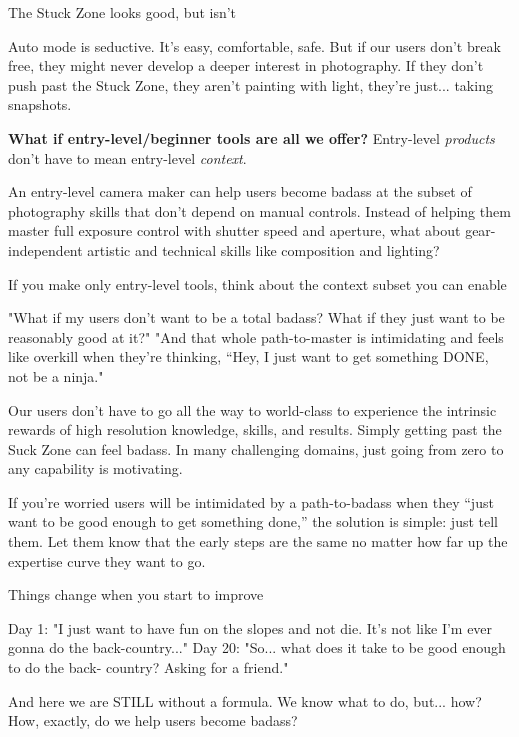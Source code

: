 The Stuck Zone looks good, but isn’t

Auto mode is seductive. It’s easy, comfortable, safe. But if our users don’t break free, they might never develop a deeper interest in photography. If they don’t push past the Stuck Zone, they aren’t painting with light, they’re just... taking snapshots.

\textbf{What if entry-level/beginner tools are all we offer?}
Entry-level \textit{products} don’t have to mean entry-level \textit{context}.

An entry-level camera maker can help users become badass at the subset of photography skills that don’t depend on manual controls. Instead of helping them master full exposure control with shutter speed and aperture, what about gear-independent artistic and technical skills like composition and lighting?

If you make only entry-level tools, think about the context subset you can enable

"What if my users don’t want to be a total badass? What if they just want to be reasonably good at it?"
"And that whole path-to-master is intimidating and feels like overkill when they’re thinking, “Hey, I just want to get something DONE, not be a ninja."

Our users don’t have to go all the way to world-class to experience the intrinsic rewards of high resolution knowledge, skills, and results.
Simply getting past the Suck Zone can feel badass.
In many challenging domains, just going from zero to any capability is motivating.

If you’re worried users will be intimidated by a path-to-badass when they “just want to be good enough to get something done,” the solution is simple: just tell them. Let them know that the early steps are the same no matter how far up the expertise curve they want to go.

Things change when you start to improve

Day 1: "I just want to have fun on the slopes and not die. It’s not like I’m ever gonna do the back-country..."
Day 20: "So... what does it take to be good enough to do the back- country? Asking for a friend."

And here we are STILL without a formula. We know what to do, but... how? How, exactly, do we help users become badass?

